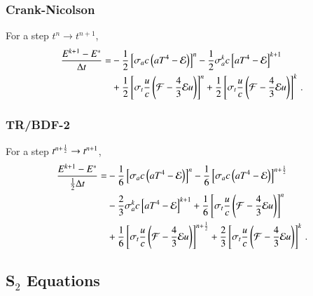 \subsubsection{Crank-Nicolson}
For a step $t^n\rightarrow t^{n+1}$,
\begin{equation}\begin{split}
  \frac{E^{k+1}-E^*}{\Delta t} = &
  -\frac{1}{2}\left[\sigma_{a} c\left(aT^4 - \mathcal{E}\right)\right]^n
  -\frac{1}{2}\sigma_{a}^k c\left[aT^4 - \mathcal{E}\right]^{k+1}\\
  &+\frac{1}{2}\left[\sigma_{t}\frac{u}{c}\left(\mathcal{F}-\frac{4}{3}\mathcal{E} u\right)\right]^n
   +\frac{1}{2}\left[\sigma_t\frac{u}{c}\left(\mathcal{F}-\frac{4}{3}\mathcal{E} u\right)\right]^k
  \, .
\end{split}\end{equation}

\subsubsection{TR/BDF-2}
For a step $t^{n+\frac{1}{2}}\rightarrow t^{n+1}$,
\begin{equation}\begin{split}
  \frac{E^{k+1}-E^*}{\frac{1}{2}\Delta t} = &
  -\frac{1}{6}\left[\sigma_a c\left(aT^4 - \mathcal{E}\right)\right]^n
  -\frac{1}{6}\left[\sigma_a c\left(aT^4 - \mathcal{E}\right)\right]^{n+\frac{1}{2}}\\
  &-\frac{2}{3}\sigma_a^k c\left[aT^4 - \mathcal{E}\right]^{k+1}
   +\frac{1}{6}\left[\sigma_t\frac{u}{c}\left(\mathcal{F}-\frac{4}{3}\mathcal{E} u\right)\right]^n\\
  &+\frac{1}{6}\left[\sigma_t\frac{u}{c}\left(\mathcal{F}-\frac{4}{3}\mathcal{E} u\right)\right]^{n+\frac{1}{2}}
   +\frac{2}{3}\left[\sigma_t\frac{u}{c}\left(\mathcal{F}-\frac{4}{3}\mathcal{E} u\right)\right]^k
  \, .
\end{split}\end{equation}


\subsection{\texorpdfstring{S$_2$}{S-2} Equations}

